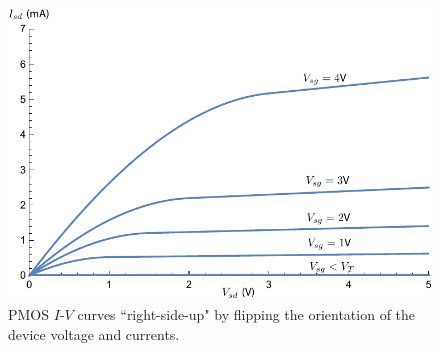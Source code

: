 \begin{figure}[tb]
\begin{center}
\includegraphics[width=.75\columnwidth]{ids_pmos_negative}
\end{center}
\caption{PMOS $I$-$V$ curves ``right-side-up" by flipping the orientation of the device voltage and currents.} \label{fig:ids_pmos_negative}
\end{figure}


